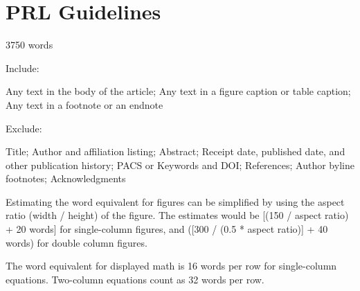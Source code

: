 \documentclass[%
 reprint,
superscriptaddress,
showpacs,preprintnumbers,
 amsmath,amssymb,
 aps,
 prl,
]{revtex4-1}
\begin{document}
\section{PRL Guidelines}

3750 words

Include:

Any text in the body of the article;
Any text in a figure caption or table caption;
Any text in a footnote or an endnote

Exclude:

Title;
Author and affiliation listing;
Abstract;
Receipt date, published date, and other publication history;
PACS or Keywords and DOI;\@
References;
Author byline footnotes;
Acknowledgments

Estimating the word equivalent for figures can be simplified by using the aspect
ratio (width / height) of the figure. The estimates would be [(150 / aspect
ratio) + 20 words] for single-column figures, and ([300 / (0.5 * aspect ratio)]
+ 40 words) for double column figures.

The word equivalent for displayed math is 16 words per row for single-column
equations. Two-column equations count as 32 words per row.




\end{document}
